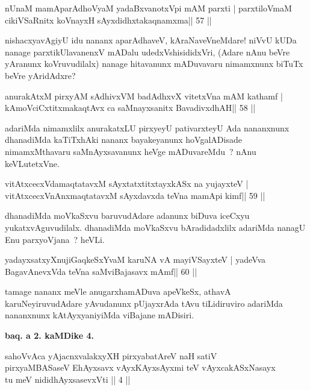 \begin{shl}
nUnaM mamAparAdhoV\s yaM yadaBxvanotxV\s pi mAM parxti |
parxtiloVmaM cikiVSaRnitx koV\s nayxH sAyxdidhxtakaqnamxma\hfill || 57 ||
\end{shl}

\begin{artha}
nishacxyavAgiyU idu nananx aparAdhaveV, kAraNaveVneMdare! niVvU kUDa
nanage parxtikUlavanenxV mADalu udedxVshisididxVri, (Adare nAnu
beVre yAranunx koVruvudilalx) nanage  hitavanunx mADuvavaru nimamxnunx
biTuTx beVre yAridAdxre?
\end{artha}

\begin{shl}
anurakAtxM pirxyAM sAdhivxVM badAdhxvX vitetxVna mAM kathamf |
kAmoVciCxtitxmakaqtAvx ca saMnayxsanitx BavadivxdhAH\hfill || 58 ||
\end{shl}

\begin{artha}
adariMda nimamxlilx anurakatxLU pirxyeyU pativarxteyU Ada nananxnunx dhanadiMda kaTiTxhAki nananx bayakeyanunx hoVgalADisade nimamxMthavaru saMnAyxsavanunx heVge mADuvareMdu~? nAnu keVLutetxVne.
\end{artha}

\begin{shl}
vitAtxcecxVdamaqtatavxM sAyxtatxtitxtayxkASx na yujayxteV |
vitAtxcecxVnAnxmaqtatavxM sAyxdavxda teVna mamApi kimf\hfill || 59 ||
\end{shl}

\begin{artha}
dhanadiMda moVkaSxvu baruvudAdare adanunx biDuva iceCxyu yukatxvAguvudilalx. dhanadiMda moVkaSxvu bAradidadxlilx adariMda nanagU Enu parxyoVjana~? heVLi.
\end{artha}

\begin{shl}
yadayxsatxyXnujiGaqkeSxYvaM karuNA vA mayiVSayxteV |
yadeVva BagavAnevxVda teVna saMviBajasavx mAmf\hfill || 60 ||
\end{shl}

\begin{artha}
tamage nananx meVle anugarxhamADuva apeVkeSx, athavA karuNeyiruvudAdare yAvudanunx pUjayxrAda tAvu tiLidiruviro adariMda nananxnunx kAtAyxyaniyiMda viBajane mADisiri.
\end{artha}

\begin{center}
\textbf{baq. a 2. kaMDike 4.}
\end{center}

\begin{shl}
sahoVvAca yAjacnxvalakxyXH pirxyabatAreV naH satiV\\
pirxyaMBASaseV EhAyxsavx vAyxKAyxsAyxmi teV vAyxcakASxNasayx\\
tu meV nididhAyxsasevxVti || 4 ||
\end{shl}

